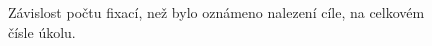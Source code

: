 \begin{center}
\begin{figure}
\centering
\caption{Závislost počtu fixací, než bylo oznámeno nalezení cíle, na celkovém čísle úkolu.}
\label{fixgrid}
\end{figure} 


\end{center}
